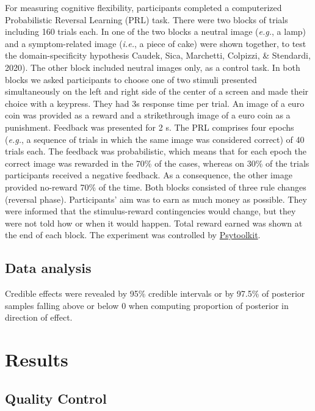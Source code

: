\documentclass[
  man,floatsintext]{apa6}
\begin{document}
For measuring cognitive flexibility, participants completed a computerized Probabilistic Reversal Learning (PRL) task.
There were two blocks of trials including 160 trials each. In one of the two blocks a neutral image (\emph{e.g.}, a lamp) and a symptom-related image (\emph{i.e.}, a piece of cake) were shown together, to test the domain-specificity hypothesis Caudek, Sica, Marchetti, Colpizzi, \& Stendardi, 2020). The other block included neutral images only, as a control task.
In both blocks we asked participants to choose one of two stimuli presented simultaneously on the left and right side of the center of a screen and made their choice with a keypress. They had 3s response time per trial. An image of a euro coin was provided as a reward and a strikethrough image of a euro coin as a punishment. Feedback was presented for 2 s.
The PRL comprises four epochs (\emph{e.g.}, a sequence of trials in which the same image was considered correct) of 40 trials each.
The feedback was probabilistic, which means that for each epoch the correct image was rewarded in the 70\% of the cases, whereas on 30\% of the trials participants received a negative feedback.
As a consequence, the other image provided no-reward 70\% of the time. Both blocks consisted of three rule changes (reversal phase).
Participants' aim was to earn as much money as possible. They were informed that the stimulus-reward contingencies would change, but they were not told how or when it would happen. Total reward earned was shown at the end of each block.
The experiment was controlled by \href{https://www.psytoolkit.org/}{Psytoolkit}.

\hypertarget{data-analysis}{%
\subsection{Data analysis}\label{data-analysis}}

Credible effects were revealed by 95\% credible intervals or by 97.5\% of posterior samples falling above or below 0 when computing proportion of posterior in direction of effect.

\hypertarget{results}{%
\section{Results}\label{results}}

\hypertarget{quality-control}{%
\subsection{Quality Control}\label{quality-control}}
\end{document}

